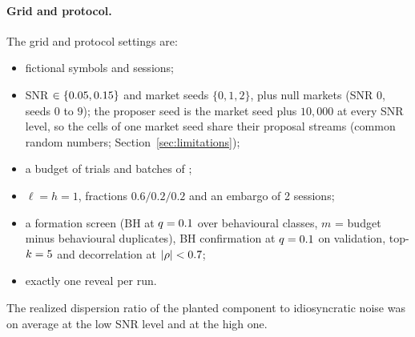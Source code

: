 \paragraph{Grid and protocol.} The grid and protocol settings are:
\begin{itemize}
  \item \SynSymbols{} fictional symbols and \SynSessions{} sessions;
  \item SNR $\in\{0.05,0.15\}$ and market seeds $\{0,1,2\}$,
    plus \SynNullSeeds{} null markets (SNR $0$, seeds $0$ to $9$); the
    proposer seed is the market seed plus $10{,}000$ at every SNR level, so
    the cells of one market seed share their proposal streams (common random
    numbers; Section~\ref{sec:limitations});
  \item a budget of \SynBudget{} trials and batches of \SynBatch{};
  \item $\ell=h=1$, fractions $0.6/0.2/0.2$ and an embargo of 2 sessions;
  \item a formation screen (BH at $q=0.1$ over behavioural
    classes, $m$ = budget minus behavioural duplicates), BH confirmation at
    $q=0.1$ on validation, top-$k=5$ and decorrelation at
    $|\rho|<0.7$;
  \item exactly one reveal per run.
\end{itemize}
The realized dispersion ratio of the planted component to idiosyncratic
noise was \SynRealizedSnrLow{} on average at the low SNR level and
\SynRealizedSnrHigh{} at the high one.

